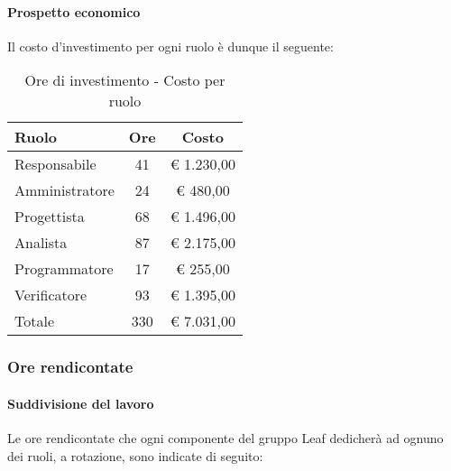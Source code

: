 \documentclass[../PianoProgetto.tex]{subfiles}
\begin{document}
	\paragraph{Prospetto economico}
					Il costo d'investimento per ogni ruolo è dunque il seguente:
					\begin{table}[h]
		\centering
	
		\begin{tabular}{l * {2}{c}}
			\toprule
			Ruolo & Ore & Costo \\
			\midrule
			Responsabile &	41 & \euro{} 1.230,00 \\
			\midrule
			Amministratore & 24 & \euro{} 480,00 \\
			\midrule
			Progettista & 68 & \euro{} 1.496,00 \\
			\midrule
			Analista & 87 & \euro{} 2.175,00 \\
			\midrule
			Programmatore & 17 & \euro{} 255,00 \\
			\midrule
			Verificatore & 93 & \euro{} 1.395,00 \\
			\midrule		
			Totale & 330 & \euro{} 7.031,00 \\
			\bottomrule
			
		\end{tabular}
		
		\caption{Ore di investimento - Costo per ruolo}
		\label{tab:investimento_costo}
		
	\end{table}
	
	\subsubsection{Ore rendicontate}
				\paragraph{Suddivisione del lavoro}
					Le ore rendicontate che ogni componente del gruppo Leaf dedicherà ad ognuno dei ruoli, a rotazione, sono indicate di seguito:
	
\end{document}
